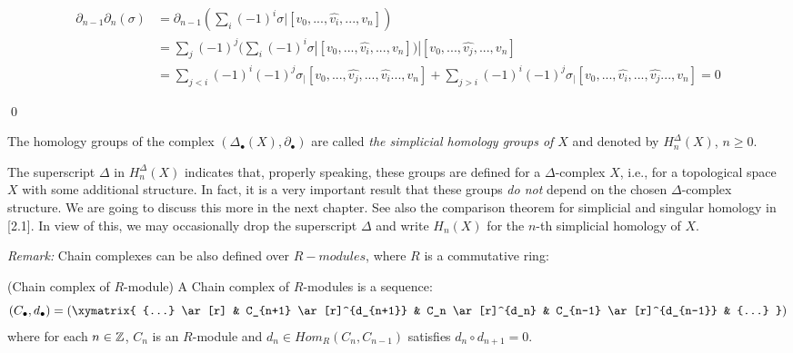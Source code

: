 \documentclass[11pt,a4paper]{report}
\begin{document}
            \begin{equation}
                \begin{aligned}
                    \partial_{n-1} \partial_n(\sigma) &=  \partial_{n-1}(\sum\limits_i (-1)^i \sigma | [v_0, ... ,\hat{v_i}, ... , v_n]) \\
                    &=  \sum\limits_j (-1)^j ( \sum\limits_i (-1)^i \sigma | [v_0, ... ,\hat{v_i}, ... , v_n]) | [v_0, ... ,\hat{v_j}, ... , v_n] \\
                    &=  \sum\limits_{j<i} (-1)^i(-1)^j  \sigma_ | [v_0, ... ,\hat{v_j},... ,\hat{v_i} ... , v_n] +
                    \sum\limits_{j>i} (-1)^i(-1)^{j}  \sigma_ | [v_0, ... ,\hat{v_i},... ,\hat{v_j} ... , v_n] = 0
                \end{aligned}
            \end{equation}
            
            \qed
            
            The homology groups of the complex $(\Delta_\bullet(X), \partial_\bullet)$ are called \emph{the simplicial homology groups of $X$} and denoted by $H^\Delta_n(X)$, $n\geq 0$.

        The superscript $\Delta$ in $H^\Delta_n(X)$ indicates that, properly speaking, these groups are defined for a $\Delta$-complex $X$, i.e., for a topological space $X$ with some additional structure. In fact, it is a very important result that these groups \emph{do not} depend on the chosen $\Delta$-complex structure. We are going to discuss this more in the next chapter. See also the comparison theorem for simplicial and singular homology in \cite{hatcher}[2.1]. In view of this, we may occasionally drop the superscript $\Delta$ and write $H_n(X)$ for the $n$-th simplicial homology of $X$.
            
        \emph{Remark: } Chain complexes can be also defined over $R-modules$, where $R$ is a commutative ring:

        \begin{defn} (Chain complex of $R$-module)
        A Chain complex of $R$-modules is a sequence:
                \[ (C_\bullet, d_\bullet)= (
                        \xymatrix{
                            {...}  \ar[r] &
                            C_{n+1}  \ar[r]^{d_{n+1}} &
                            C_n  \ar[r]^{d_n} &
                            C_{n-1}  \ar[r]^{d_{n-1}} &
                            {...}
                             } )
                   \]
        where for each $n \in \mathbb{Z}$, $C_n$ is an $R$-module and $d_n \in Hom_{R}(C_n, C_{n-1})$ satisfies
        $d_n \circ d_{n+1} = 0$.
        \end{defn}
\end{document}

